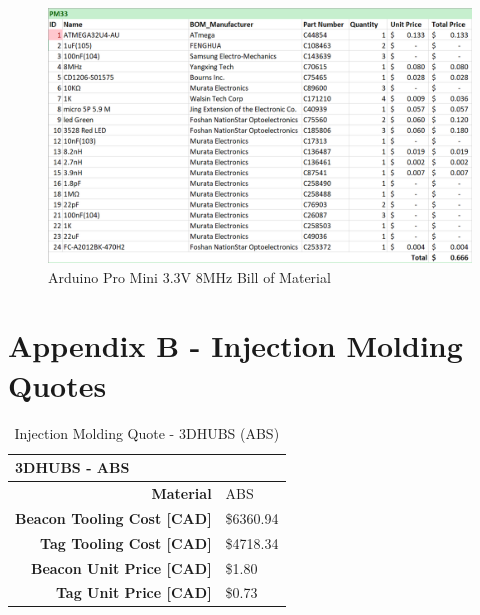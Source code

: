 \begin{figure}[H]
\centering
    \includegraphics[width=\linewidth]{./images/pm33.png}
    \caption{Arduino Pro Mini 3.3V 8MHz Bill of Material}
\end{figure}


\pagebreak
\setcounter{section}{5}
\section{Appendix B - Injection Molding Quotes}

\medskip
\bgroup
\def\arraystretch{1.75}
\begin{table}[H]
\centering
\begin{tabular}{ | m{5cm} | m{10cm} |}
\hline
\multicolumn{2}{|l|}{\textbf{3DHUBS - ABS}}  \\ 
\hline
\multicolumn{1}{|r|}{\textbf{Material}} & ABS \\
\hline
\multicolumn{1}{|r|}{\textbf{Beacon Tooling Cost [CAD]}} & \$6360.94 \\
\hline
\multicolumn{1}{|r|}{\textbf{Tag Tooling Cost [CAD]}} & \$4718.34 \\
\hline
\multicolumn{1}{|r|}{\textbf{Beacon Unit Price [CAD]}} & \$1.80 \\
\hline
\multicolumn{1}{|r|}{\textbf{Tag Unit Price [CAD]}} & \$0.73 \\
\hline
\end{tabular}
\caption{Injection Molding Quote - 3DHUBS (ABS)}
\end{table}


